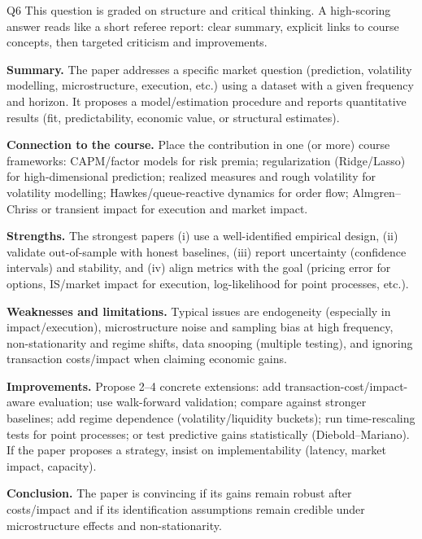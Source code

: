 \begin{solutionbox}{Q6}
This question is graded on structure and critical thinking. A high-scoring answer reads like a short referee report: clear summary, explicit links to course concepts, then targeted criticism and improvements.

\medskip
\textbf{Summary.} The paper addresses a specific market question (prediction, volatility modelling, microstructure, execution, etc.) using a dataset with a given frequency and horizon. It proposes a model/estimation procedure and reports quantitative results (fit, predictability, economic value, or structural estimates).

\medskip
\textbf{Connection to the course.} Place the contribution in one (or more) course frameworks: CAPM/factor models for risk premia; regularization (Ridge/Lasso) for high-dimensional prediction; realized measures and rough volatility for volatility modelling; Hawkes/queue-reactive dynamics for order flow; Almgren--Chriss or transient impact for execution and market impact.

\medskip
\textbf{Strengths.} The strongest papers (i) use a well-identified empirical design, (ii) validate out-of-sample with honest baselines, (iii) report uncertainty (confidence intervals) and stability, and (iv) align metrics with the goal (pricing error for options, IS/market impact for execution, log-likelihood for point processes, etc.).

\medskip
\textbf{Weaknesses and limitations.} Typical issues are endogeneity (especially in impact/execution), microstructure noise and sampling bias at high frequency, non-stationarity and regime shifts, data snooping (multiple testing), and ignoring transaction costs/impact when claiming economic gains.

\medskip
\textbf{Improvements.} Propose 2--4 concrete extensions: add transaction-cost/impact-aware evaluation; use walk-forward validation; compare against stronger baselines; add regime dependence (volatility/liquidity buckets); run time-rescaling tests for point processes; or test predictive gains statistically (Diebold--Mariano). If the paper proposes a strategy, insist on implementability (latency, market impact, capacity).

\medskip
\textbf{Conclusion.} The paper is convincing if its gains remain robust after costs/impact and if its identification assumptions remain credible under microstructure effects and non-stationarity.
\end{solutionbox}


